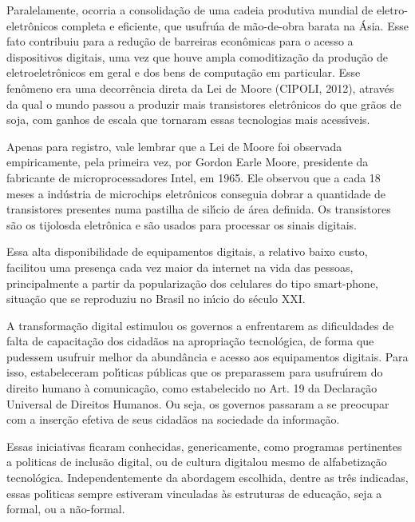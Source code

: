 \documentclass[
12pt,		%
openright,	%
twoside,  %
a4paper,			%
chapter=TITLE,		%
english,			%
french,				%
spanish,			%
brazil				%
]{USPSC-classe/USPSC}
\begin{document}
Paralelamente, ocorria a consolida\c{c}\~ao de uma cadeia produtiva mundial de eletro-eletr\^onicos completa e eficiente, que usufru\'{\i}a de m\~ao-de-obra barata na \'Asia. Esse fato contribuiu para a redu\c{c}\~ao de barreiras econ\^omicas para o acesso a dispositivos digitais, uma vez que houve ampla comoditiza\c{c}\~ao da produ\c{c}\~ao de eletroeletr\^onicos em geral e dos bens de computa\c{c}\~ao em particular. Esse fen\^omeno era uma decorr\^encia direta da Lei de Moore (CIPOLI, 2012), atrav\'es da qual o mundo passou a produzir mais transistores eletr\^onicos do que gr\~aos de soja, com ganhos de escala que tornaram essas tecnologias mais acess\'{\i}veis.




Apenas para registro, vale lembrar que a Lei de Moore foi observada empiricamente, pela primeira vez, por Gordon Earle Moore, presidente da fabricante de microprocessadores Intel, em 1965. Ele observou que a cada 18 meses a ind\'ustria de microchips eletr\^onicos conseguia dobrar a quantidade de transistores presentes numa pastilha de sil\'{\i}cio de \'area definida. Os transistores s\~ao os \textquotedbl tijolos\textquotedbl  da eletr\^onica e s\~ao usados para processar os sinais digitais.




Essa alta disponibilidade de equipamentos digitais, a relativo baixo custo, facilitou uma presen\c{c}a cada vez maior da internet na vida das pessoas, principalmente a partir da populariza\c{c}\~ao dos celulares do tipo \textquotedbl smart-phone\textquotedbl , situa\c{c}\~ao que se reproduziu no Brasil no in\'{\i}cio do s\'eculo XXI.




A transforma\c{c}\~ao digital estimulou os governos a enfrentarem as dificuldades  de falta de  capacita\c{c}\~ao dos cidad\~aos na apropria\c{c}\~ao tecnol\'ogica, de forma que pudessem usufruir melhor da abund\^ancia e acesso aos equipamentos digitais. Para isso, estabeleceram pol\'{\i}ticas p\'ublicas que os preparassem para usufru\'{\i}rem do direito humano \`a comunica\c{c}\~ao, como estabelecido no Art. 19 da Declara\c{c}\~ao Universal de Direitos Humanos. Ou seja, os governos passaram a se preocupar com a inser\c{c}\~ao efetiva de seus cidad\~aos na sociedade da informa\c{c}\~ao.




Essas iniciativas ficaram conhecidas, genericamente, como programas pertinentes a politicas de \textquotedbl inclus\~ao digital, ou  de \textquotedbl cultura digital\textquotedbl  ou mesmo de \textquotedbl alfabetiza\c{c}\~ao tecnol\'ogica\textquotedbl . Independentemente da abordagem escolhida, dentre as tr\^es indicadas, essas pol\'{\i}ticas sempre estiveram vinculadas \`as estruturas de educa\c{c}\~ao, seja a formal, ou a n\~ao-formal.
\end{document}

